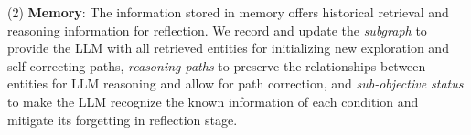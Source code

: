 \documentclass{article}
\begin{document}
(2) \textbf{Memory}: The information stored in memory offers historical retrieval and reasoning information for reflection. 
We record and update the \textit{subgraph} to provide the LLM with all retrieved entities for initializing new exploration and self-correcting paths, \textit{reasoning paths} to preserve the relationships between entities for LLM reasoning and allow for path correction, and \textit{sub-objective status} to make the LLM recognize the known information of each condition and mitigate its forgetting in reflection stage.
\end{document}
